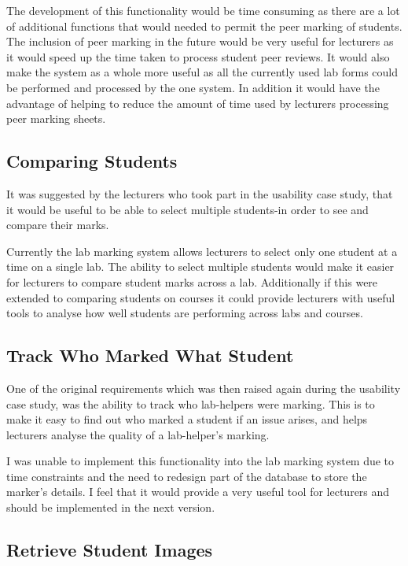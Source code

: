 \documentclass[11pt]{report}
\begin{document}
The development of this functionality would be time consuming as there are a lot of additional functions that would needed to permit the peer marking of students. The inclusion of peer marking in the future would be very useful for lecturers as it would speed up the time taken to process student peer reviews. It would also make the system as a whole more useful as all the currently used lab forms could be performed and processed by the one system. In addition it would have the advantage of helping to reduce the amount of time used by lecturers processing peer marking sheets. 

\subsection{Comparing Students}

It was suggested by the lecturers who took part in the usability case study, that it would be useful to be able to select multiple students-in order to see and compare their marks.

Currently the lab marking system allows lecturers to select only one student at a time on a single lab. The ability to select multiple students would make it easier for lecturers to compare student marks across a lab. Additionally if this were extended to comparing students on courses it could provide lecturers with useful tools to analyse how well students are performing across labs and courses.




\subsection{Track Who Marked What Student}

One of the original requirements which was then raised again during the usability case study, was the ability to track who lab-helpers were marking. This is to make it easy to find out who marked a student if an issue arises, and helps lecturers analyse the quality of a lab-helper's marking. 

I was unable to implement this functionality into the lab marking system due to time constraints and the need to redesign part of the database to store the marker's details. I feel that it would provide a very useful tool for lecturers and should be implemented in the next version.

\subsection{Retrieve Student Images}
\end{document}
